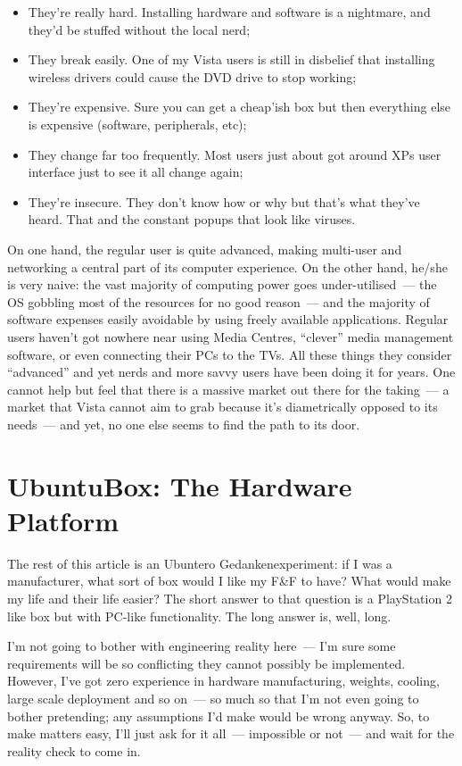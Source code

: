 \documentclass{book}
\begin{document}
\begin{itemize}
\item They're really hard. Installing hardware and software is a
  nightmare, and they'd be stuffed without the local nerd;
\item They break easily. One of my Vista users is still in disbelief
  that installing wireless drivers could cause the DVD drive to stop
  working;
\item They're expensive. Sure you can get a cheap'ish box but then
  everything else is expensive (software, peripherals, etc);
\item They change far too frequently. Most users just about got around
  XPs user interface just to see it all change again;
\item They're insecure. They don't know how or why but that's what
  they've heard. That and the constant popups that look like viruses.
\end{itemize}

On one hand, the regular user is quite advanced, making multi-user and
networking a central part of its computer experience. On the other
hand, he/she is very naive: the vast majority of computing power goes
under-utilised~--- the OS gobbling most of the resources for no good
reason~--- and the majority of software expenses easily avoidable by
using freely available applications. Regular users haven't got nowhere
near using Media Centres, ``clever'' media management software, or
even connecting their PCs to the TVs. All these things they consider
``advanced'' and yet nerds and more savvy users have been doing it for
years. One cannot help but feel that there is a massive market out
there for the taking~--- a market that Vista cannot aim to grab
because it's diametrically opposed to its needs~--- and yet, no one
else seems to find the path to its door.

\section{UbuntuBox: The Hardware Platform}

The rest of this article is an Ubuntero Gedankenexperiment: if I was a
manufacturer, what sort of box would I like my F\&F to have? What would
make my life and their life easier? The short answer to that question
is a PlayStation 2 like box but with PC-like functionality. The long
answer is, well, long.

I'm not going to bother with engineering reality here~--- I'm sure
some requirements will be so conflicting they cannot possibly be
implemented. However, I've got zero experience in hardware
manufacturing, weights, cooling, large scale deployment and so on~---
so much so that I'm not even going to bother pretending; any
assumptions I'd make would be wrong anyway. So, to make matters easy,
I'll just ask for it all~--- impossible or not~--- and wait for the
reality check to come in.
\end{document}
